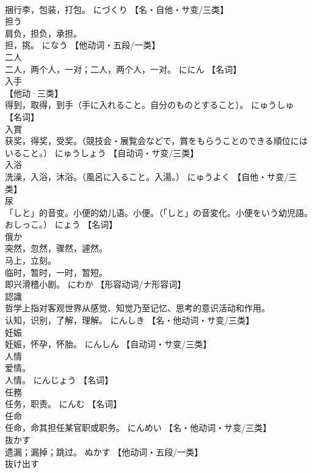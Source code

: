 \documentclass[8pt]{extreport}
\begin{document}
\begin{CJK}{UTF8}{min}
\\	捆行李，包装，打包。	にづくり		【名・自他・サ变/三类】
\\	担う	
\\	肩负，担负，承担。 
\\	担，挑。	になう		【他动词・五段/一类】
\\	二人	
\\	二人，两个人，一对；二人，两个人，一对。	ににん		【名词】
\\	入手	
\\	【他动·三类】 
\\	得到，取得，到手（手に入れること。自分のものとすること）。	にゅうしゅ		【名词】
\\	入賞	
\\	获奖，得奖，受奖。（競技会・展覧会などで，賞をもらうことのできる順位にはいること。）	にゅうしょう		【自动词・サ变/三类】
\\	入浴	
\\	洗澡，入浴，沐浴。（風呂に入ること。入湯。）	にゅうよく		【自他・サ变/三类】
\\	尿	
\\	「しと」的音变。小便的幼儿语。小便。（「しと」の音変化。小便をいう幼児語。おしっこ。）	にょう		【名词】
\\	俄か	
\\	突然，忽然，骤然，遽然。 
\\	马上，立刻。 
\\	临时，暂时，一时，暂短。 
\\	即兴滑稽小剧。	にわか		【形容动词/ナ形容词】
\\	認識	
\\	哲学上指对客观世界从感觉、知觉乃至记忆、思考的意识活动和作用。 
\\	认知，识别，了解，理解。	にんしき		【名・他动词・サ变/三类】
\\	妊娠	
\\	妊娠，怀孕，怀胎。	にんしん		【自动词・サ变/三类】
\\	人情	
\\	爱情。 
\\	人情。	にんじょう		【名词】
\\	任務	
\\	任务，职责。	にんむ		【名词】
\\	任命	
\\	任命，命其担任某官职或职务。	にんめい		【名・他动词・サ变/三类】
\\	抜かす	
\\	遗漏；漏掉；跳过。	ぬかす		【他动词・五段/一类】
\\	抜け出す	

\end{CJK}
\end{document}
